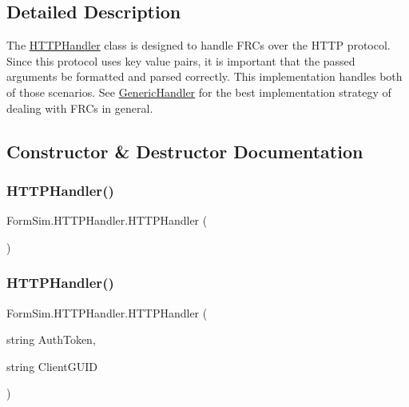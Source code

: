 \subsection{Detailed Description}
The \mbox{\hyperlink{class_form_sim_1_1_h_t_t_p_handler}{H\+T\+T\+P\+Handler}} class is designed to handle F\+R\+Cs over the H\+T\+TP protocol. Since this protocol uses key value pairs, it is important that the passed arguments be formatted and parsed correctly. This implementation handles both of those scenarios. See \mbox{\hyperlink{class_form_sim_1_1_generic_handler}{Generic\+Handler}} for the best implementation strategy of dealing with F\+R\+Cs in general. 



\subsection{Constructor \& Destructor Documentation}
\mbox{\label{class_form_sim_1_1_h_t_t_p_handler_a8986ccceb64ce8804f354744961fc31f}} 
\subsubsection{\texorpdfstring{H\+T\+T\+P\+Handler()}{HTTPHandler()}\hspace{0.1cm}{\footnotesize\ttfamily [1/3]}}
{\footnotesize\ttfamily Form\+Sim.\+H\+T\+T\+P\+Handler.\+H\+T\+T\+P\+Handler (\begin{DoxyParamCaption}{ }\end{DoxyParamCaption})\hspace{0.3cm}{\ttfamily [inline]}}

\mbox{\label{class_form_sim_1_1_h_t_t_p_handler_a2c39bc0dae5d5f2b26a84b1867d6ca23}} 
\subsubsection{\texorpdfstring{H\+T\+T\+P\+Handler()}{HTTPHandler()}\hspace{0.1cm}{\footnotesize\ttfamily [2/3]}}
{\footnotesize\ttfamily Form\+Sim.\+H\+T\+T\+P\+Handler.\+H\+T\+T\+P\+Handler (\begin{DoxyParamCaption}\item[{string}]{Auth\+Token,  }\item[{string}]{Client\+G\+U\+ID }\end{DoxyParamCaption})\hspace{0.3cm}{\ttfamily [inline]}}

